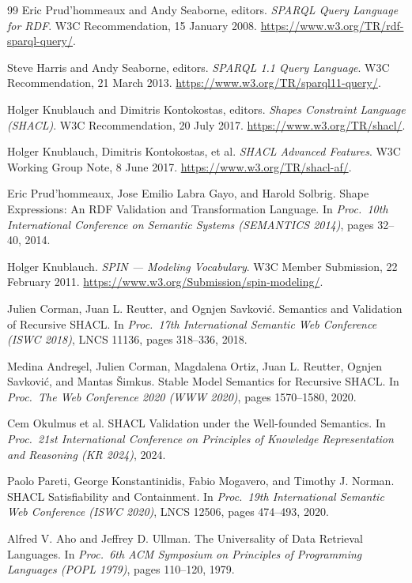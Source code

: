 \documentclass[11pt,letterpaper]{article}
\theoremstyle{definition}
\begin{document}
\begin{thebibliography}{99}
Eric Prud'hommeaux and Andy Seaborne, editors. \emph{SPARQL Query Language for RDF}. W3C Recommendation, 15 January 2008. \url{https://www.w3.org/TR/rdf-sparql-query/}.

Steve Harris and Andy Seaborne, editors. \emph{SPARQL 1.1 Query Language}. W3C Recommendation, 21 March 2013. \url{https://www.w3.org/TR/sparql11-query/}.

Holger Knublauch and Dimitris Kontokostas, editors. \emph{Shapes Constraint Language (SHACL)}. W3C Recommendation, 20 July 2017. \url{https://www.w3.org/TR/shacl/}.

Holger Knublauch, Dimitris Kontokostas, et al. \emph{SHACL Advanced Features}. W3C Working Group Note, 8 June 2017. \url{https://www.w3.org/TR/shacl-af/}.

Eric Prud'hommeaux, Jose Emilio Labra Gayo, and Harold Solbrig. Shape Expressions: An RDF Validation and Transformation Language. In \emph{Proc.\ 10th International Conference on Semantic Systems (SEMANTICS 2014)}, pages 32--40, 2014.

Holger Knublauch. \emph{SPIN --- Modeling Vocabulary}. W3C Member Submission, 22 February 2011. \url{https://www.w3.org/Submission/spin-modeling/}.

Julien Corman, Juan L. Reutter, and Ognjen Savkovi\'c. Semantics and Validation of Recursive SHACL. In \emph{Proc.\ 17th International Semantic Web Conference (ISWC 2018)}, LNCS 11136, pages 318--336, 2018.

Medina Andre\c{s}el, Julien Corman, Magdalena Ortiz, Juan L. Reutter, Ognjen Savkovi\'c, and Mantas \v{S}imkus. Stable Model Semantics for Recursive SHACL. In \emph{Proc.\ The Web Conference 2020 (WWW 2020)}, pages 1570--1580, 2020.

Cem Okulmus et al. SHACL Validation under the Well-founded Semantics. In \emph{Proc.\ 21st International Conference on Principles of Knowledge Representation and Reasoning (KR 2024)}, 2024.

Paolo Pareti, George Konstantinidis, Fabio Mogavero, and Timothy J. Norman. SHACL Satisfiability and Containment. In \emph{Proc.\ 19th International Semantic Web Conference (ISWC 2020)}, LNCS 12506, pages 474--493, 2020.

Alfred V. Aho and Jeffrey D. Ullman. The Universality of Data Retrieval Languages. In \emph{Proc.\ 6th ACM Symposium on Principles of Programming Languages (POPL 1979)}, pages 110--120, 1979.


\end{thebibliography}
\end{document}
